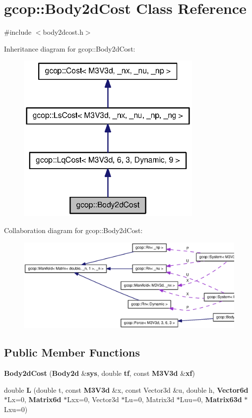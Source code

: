 \section{gcop\-:\-:\-Body2d\-Cost \-Class \-Reference}
\label{classgcop_1_1Body2dCost}


{\ttfamily \#include $<$body2dcost.\-h$>$}



\-Inheritance diagram for gcop\-:\-:\-Body2d\-Cost\-:\nopagebreak
\begin{figure}[H]
\begin{center}
\leavevmode
\includegraphics[width=254pt]{classgcop_1_1Body2dCost__inherit__graph}
\end{center}
\end{figure}


\-Collaboration diagram for gcop\-:\-:\-Body2d\-Cost\-:\nopagebreak
\begin{figure}[H]
\begin{center}
\leavevmode
\includegraphics[width=350pt]{classgcop_1_1Body2dCost__coll__graph}
\end{center}
\end{figure}
\subsection*{\-Public \-Member \-Functions}
\begin{DoxyCompactItemize}
\item 
{\bf \-Body2d\-Cost} ({\bf \-Body2d} \&{\bf sys}, double {\bf tf}, const {\bf \-M3\-V3d} \&{\bf xf})
\item 
double {\bf \-L} (double t, const {\bf \-M3\-V3d} \&x, const \-Vector3d \&u, double h, {\bf \-Vector6d} $\ast$\-Lx=0, {\bf \-Matrix6d} $\ast$\-Lxx=0, \-Vector3d $\ast$\-Lu=0, \-Matrix3d $\ast$\-Luu=0, {\bf \-Matrix63d} $\ast$\-Lxu=0)
\end{DoxyCompactItemize}
